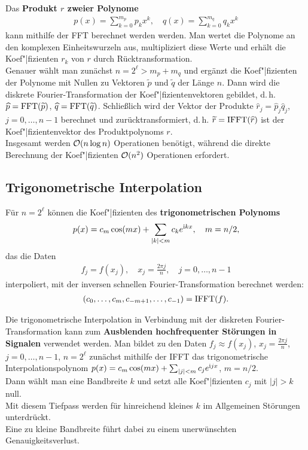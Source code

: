 \linie

Das \textbf{Produkt $r$ zweier Polynome}
\begin{align*}
    p(x) = \sum_{k=0}^{m_p} p_k x^k, \quad
    q(x) = \sum_{k=0}^{m_q} q_k x^k
\end{align*}
kann mithilfe der FFT berechnet werden werden.
Man wertet die Polynome an den komplexen Einheitswurzeln aus,
multipliziert diese Werte und erhält die Koef"|fizienten $r_k$ von $r$
durch Rücktransformation. \\
Genauer wählt man zunächst $n = 2^\ell > m_p + m_q$ und ergänzt die
Koef"|fizienten der Polynome mit Nullen zu Vektoren $\widetilde{p}$ und
$\widetilde{q}$ der Länge $n$.
Dann wird die diskrete Fourier-Transformation der Koef"|fizientenvektoren
gebildet, d.\,h. $\widehat{p} = \operatorname{FFT}(\widetilde{p})$,
$\widehat{q} = \operatorname{FFT}(\widetilde{q})$.
Schließlich wird der Vektor der Produkte
$\widehat{r}_j = \widehat{p}_j \widehat{q}_j$, $j = 0, \dotsc, n - 1$
berechnet und zurücktransformiert, d.\,h.
$\widetilde{r} = \operatorname{IFFT}(\widehat{r})$ ist der Koef"|fizientenvektor des
Produktpolynoms $r$. \\
Insgesamt werden $\mathcal{O}(n \log n)$ Operationen benötigt, während die
direkte Berechnung der Koef"|fizienten $\mathcal{O}(n^2)$ Operationen erfordert.

\subsection{%
    Trigonometrische Interpolation%
}

Für $n = 2^\ell$ können die Koef"|fizienten des
\textbf{trigonometrischen Polynoms}
\begin{align*}
    p(x) = c_m \cos(mx) + \sum_{|k| < m} c_k e^{\mathrm{i} k x}, \quad
    m = n/2,
\end{align*}
das die Daten
\begin{align*}
    f_j = f(x_j), \quad
    x_j = \frac{2\pi j}{n}, \quad
    j = 0, \dotsc, n - 1
\end{align*}
interpoliert, mit der inversen schnellen Fourier-Transformation berechnet
werden:
\begin{align*}
    (c_0, \dotsc, c_m, c_{-m+1}, \dotsc, c_{-1}) = \operatorname{IFFT}(f).
\end{align*}

\linie

Die trigonometrische Interpolation in Verbindung mit der diskreten
Fourier-Transformation kann zum
\textbf{Ausblenden hochfrequenter Störungen in Signalen} verwendet werden.
Man bildet zu den Daten $f_j \approx f(x_j)$, $x_j = \frac{2\pi j}{n}$,
$j = 0, \dotsc, n - 1$, $n = 2^\ell$ zunächst mithilfe der IFFT das
trigonometrische Interpolationspolynom
$p(x) = c_m \cos(mx) + \sum_{|j| < m} c_j e^{\mathrm{i} j x}$, $m = n/2$. \\
Dann wählt man eine Bandbreite $k$ und setzt alle Koef"|fizienten $c_j$
mit $|j| > k$ null. \\
Mit diesem Tiefpass werden für hinreichend kleines $k$ im Allgemeinen
Störungen unterdrückt. \\
Eine zu kleine Bandbreite führt dabei zu einem unerwünschten
Genauigkeitsverlust.

